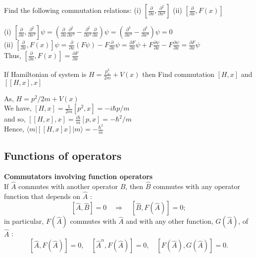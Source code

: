 \begin{exercise}
 Find the following commutation relations:
	(i) $\left[\frac{\partial}{\partial x}, \frac{\partial^{2}}{\partial x^{2}}\right]$
	(ii) $\left[\frac{\partial}{\partial x}, F(x)\right]$
\end{exercise}
\begin{answer}
(i) $\left[\frac{\partial}{\partial x}, \frac{\partial^{2}}{\partial x^{2}}\right] \psi=\left(\frac{\partial}{\partial x} \frac{\partial^{2}}{\partial x^{2}}-\frac{\partial^{2}}{\partial x^{2}} \frac{\partial}{\partial x}\right) \psi=\left(\frac{\partial^{3}}{\partial x^{3}}-\frac{\partial^{3}}{\partial x^{3}}\right) \psi=0$\\
(ii) $\left[\frac{\partial}{\partial x}, F(x)\right] \psi=\frac{\partial}{\partial x}(F \psi)-F \frac{\partial}{\partial x} \psi=\frac{\partial F}{\partial x} \psi+F \frac{\partial \psi}{\partial x}-F \frac{\partial \psi}{\partial x}=\frac{\partial F}{\partial x} \psi$\\
Thus, $\left[\frac{\partial}{\partial x}, F(x)\right]=\frac{\partial F}{\partial x}$	
\end{answer}
\begin{exercise}
	If Hamiltonian of system is $H=\frac{p_{x}^{2}}{2 m}+V(x)$ then Find commutation $[H, x]$ and $[[H, x], x]$
\end{exercise}
\begin{answer}
 As, $H=p^{2} / 2 m+V(x)$\\
We have, $[H, x]=\frac{1}{2 m}\left[p^{2}, x\right]=-i \hbar p / m$ \\
and so, $[[H, x], x]=\frac{i \hbar}{m}[p, x]=-\hbar^{2} / m$\\
 Hence, $\langle m|[[H, x] x]| m\rangle=-\frac{\hbar^{2}}{m}$	
\end{answer}
\subsection{Functions of operators}
\textbf{Commutators involving function operators}\\
If $\hat{A}$ commutes with another operator $\hat{B}$, then $\hat{B}$ commutes with any operator function that depends on $\hat{A}$ :
$$
[\hat{A}, \hat{B}]=0 \quad \Longrightarrow \quad[\hat{B}, F(\hat{A})]=0 ;
$$
in particular, $F(\hat{A})$ commutes with $\hat{A}$ and with any other function, $G(\hat{A})$, of $\hat{A}$ :
$$
[\hat{A}, F(\hat{A})]=0, \quad\left[\hat{A}^{n}, F(\hat{A})\right]=0, \quad[F(\hat{A}), G(\hat{A})]=0 .
$$
